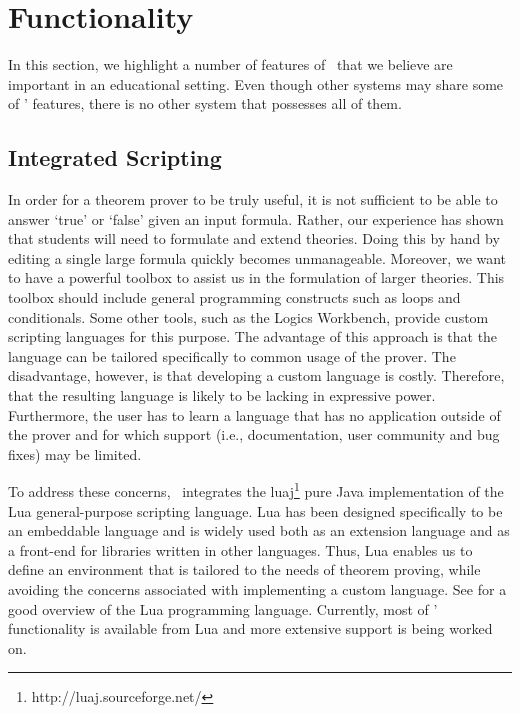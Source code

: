 \section{Functionality}
\label{sec:features}

In this section, we highlight a number of features of \oops\ that we believe
are important in an educational setting. Even though other systems may share
some of \oops' features, there is no other system that possesses all of them.

\subsection{Integrated Scripting}

In order for a theorem prover to be truly useful, it is not sufficient to be
able to answer `true' or `false' given an input formula. Rather, our
experience has shown that students will need to formulate and extend theories.
Doing this by hand by editing a single large formula quickly becomes
unmanageable.
Moreover, we want to have a powerful toolbox to assist us in the formulation
of larger theories.
This toolbox should include general programming constructs such as
loops and conditionals. Some other tools, such as the Logics Workbench, provide custom
scripting languages for this purpose. The advantage of this approach is that
the language can be tailored specifically to common usage of the prover. The
disadvantage, however, is that developing a custom language is costly.
Therefore, that the resulting language is likely to be lacking in expressive
power.
Furthermore, the user has to learn a language that has no application outside
of the prover and for which support (i.e., documentation, user community and
bug fixes) may be limited.

To address these concerns, \oops\ integrates the
luaj\footnote{http://luaj.sourceforge.net/} pure Java implementation of the Lua
general-purpose scripting language.
Lua has been designed specifically to be an embeddable language and is widely
used both as an extension language and as a front-end for libraries written in
other languages.
Thus, Lua enables us to define an environment that is tailored to the needs of
theorem proving, while avoiding the concerns associated with implementing a
custom language.
See \citet{ierusalimschy2006} for a good overview of the Lua programming
language.
Currently, most of \oops' functionality is available from Lua and more
extensive support is being worked on.

